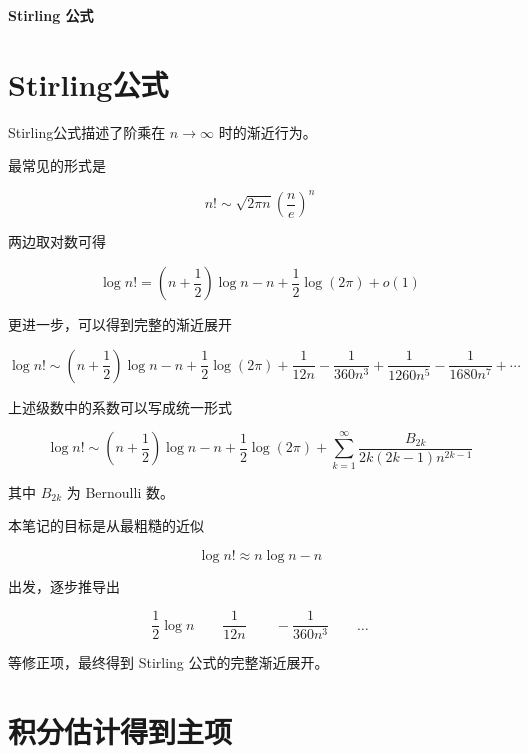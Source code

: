 \documentclass[11pt]{article}%
\newcommand{\articlename}{Stirling 公式}
\begin{document}
    \begin{center}
        \LARGE \bf \articlename
    \end{center}

    \section{Stirling公式}

    Stirling公式描述了阶乘在 \(n\to\infty\) 时的渐近行为。

    最常见的形式是

    \[
    \boxed{
    n!
    \sim
    \sqrt{2\pi n}
    \left(\frac{n}{e}\right)^n
    }
    \]

    \vspace{1em}
    两边取对数可得

    \[
    \boxed{
    \log n!
    =
    \left(n+\frac12\right)\log n
    -n
    +\frac12\log(2\pi)
    +o(1)
    }
    \]

    \vspace{1em}
    更进一步，可以得到完整的渐近展开

    \[
    \boxed{
    \log n!
    \sim
    \left(n+\frac12\right)\log n
    -n
    +\frac12\log(2\pi)
    +\frac1{12n}
    -\frac1{360n^3}
    +\frac1{1260n^5}
    -\frac1{1680n^7}
    +\cdots
    }
    \]

    \vspace{1em}
    上述级数中的系数可以写成统一形式

    \[
    \boxed{
    \log n!
    \sim
    \left(n+\frac12\right)\log n
    -n
    +\frac12\log(2\pi)
    +
    \sum_{k=1}^{\infty}
    \frac{B_{2k}}
        {2k(2k-1)n^{2k-1}}
    }
    \]

    \vspace{1em}
    其中 \(B_{2k}\) 为 Bernoulli 数。

    本笔记的目标是从最粗糙的近似

    \[
    \log n!
    \approx
    n\log n-n
    \]

    \vspace{1em}
    出发，逐步推导出

    \[
    \frac12\log n
    \qquad
    \frac1{12n}
    \qquad
    -\frac1{360n^3}
    \qquad
    \ldots
    \]

    \vspace{1em}
    等修正项，最终得到 Stirling 公式的完整渐近展开。

    \section{积分估计得到主项}
\end{document}
